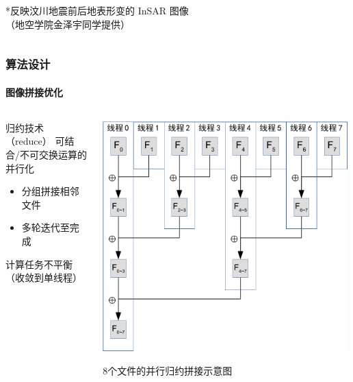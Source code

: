 \documentclass{beamer}
\begin{document}
\begin{frame}
\begin{columns}
\begin{column}{0.5\textwidth}
            \begin{tiny}
            *反映汶川地震前后地表形变的 InSAR 图像 \\
            （地空学院金泽宇同学提供）
            \end{tiny}
        \end{column}
    \end{columns}
\end{frame}


\begin{frame}
    \frametitle{算法设计}
    \framesubtitle{图像拼接优化}

    \begin{columns}
        \begin{column}{0.5\textwidth}
            \begin{block}{归约技术（reduce）}
                \small
                可结合/不可交换运算的并行化
                \begin{itemize}
                    \item 分组拼接相邻文件
                    \item 多轮迭代至完成
                \end{itemize}
                计算任务不平衡（收敛到单线程）
            \end{block}
        \end{column}
        \begin{column}{0.5\textwidth}
            \centering
            \includegraphics[width=0.99\textwidth]{figures/reduce.pdf}
            \begin{tiny}
            8个文件的并行归约拼接示意图
            \end{tiny}
        \end{column}
    \end{columns}
\end{frame}
\end{document}

